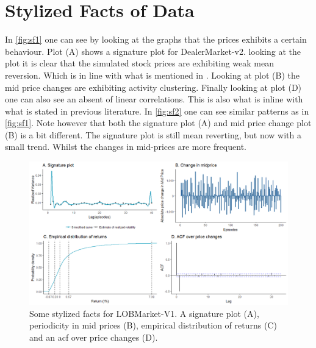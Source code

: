 \documentclass{kththesis}
\theoremstyle{definition}
\begin{document}
\section{Stylized Facts of Data}
In \autoref{fig:sf1} one can see by looking at the graphs that the prices exhibits a certain behaviour. Plot (A) shows a signature plot for DealerMarket-v2. looking at the plot it is clear that the simulated stock prices are exhibiting weak mean reversion. Which is in line with what is mentioned in \parencite{bouchaud2018trades}. 
\newline
\newline
Looking at plot (B) the mid price changes are exhibiting activity clustering. Finally looking at plot (D) one can also see an absent of linear correlations. This is also what is inline with what is stated in previous literature. In \autoref{fig:sf2} one can see similar patterns as in \autoref{fig:sf1}. Note however that both the signature plot (A) and mid price change plot (B) is a bit different. The signature plot is still mean reverting, but now with a small trend. Whilst the changes in mid-prices are more frequent. 
\begin{figure}[H]
		\centering
		\includegraphics[scale=.5]{lobv1_sf_multi.png}
		\caption{Some stylized facts for LOBMarket-V1. A signature plot (A), periodicity in mid prices (B), empirical distribution of returns (C) and an acf over price changes (D). }
		\label{fig:sf2}
\end{figure}
\end{document}
